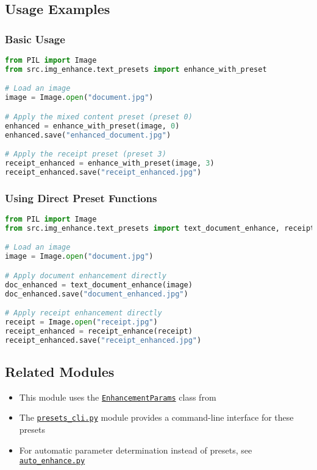 \subsection{Usage Examples}

\subsubsection{Basic Usage}
\begin{lstlisting}[language=Python, caption=Basic Preset Usage]
from PIL import Image
from src.img_enhance.text_presets import enhance_with_preset

# Load an image
image = Image.open("document.jpg")

# Apply the mixed content preset (preset 0)
enhanced = enhance_with_preset(image, 0)
enhanced.save("enhanced_document.jpg")

# Apply the receipt preset (preset 3)
receipt_enhanced = enhance_with_preset(image, 3)
receipt_enhanced.save("receipt_enhanced.jpg")
\end{lstlisting}

\subsubsection{Using Direct Preset Functions}
\begin{lstlisting}[language=Python, caption=Direct Function Usage]
from PIL import Image
from src.img_enhance.text_presets import text_document_enhance, receipt_enhance

# Load an image
image = Image.open("document.jpg")

# Apply document enhancement directly
doc_enhanced = text_document_enhance(image)
doc_enhanced.save("document_enhanced.jpg")

# Apply receipt enhancement directly
receipt = Image.open("receipt.jpg")
receipt_enhanced = receipt_enhance(receipt)
receipt_enhanced.save("receipt_enhanced.jpg")
\end{lstlisting}

\subsection{Related Modules}
\begin{itemize}
    \item This module uses the \hyperref[sec:enhancer]{\texttt{EnhancementParams}} class from 
    \item The \hyperref[sec:presets_cli]{\texttt{presets\_cli.py}} module provides a command-line interface for these presets
    \item For automatic parameter determination instead of presets, see \hyperref[sec:auto_enhance]{\texttt{auto\_enhance.py}}
\end{itemize} 